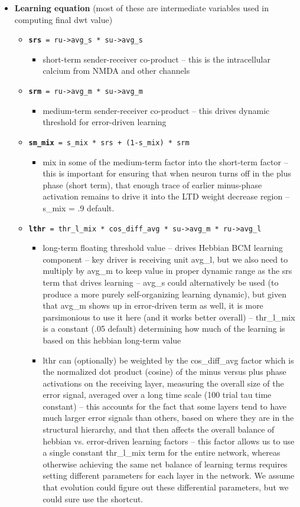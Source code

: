 \begin{itemize}
\item {\bf Learning equation} (most of these are intermediate variables used in computing final dwt value)
  \begin{itemize}
  \item {\tt {\bf srs} = ru->avg\_s * su->avg\_s}
    \begin{itemize}
    \item short-term sender-receiver co-product -- this is the intracellular calcium from NMDA and other channels
    \end{itemize}
  \item {\tt {\bf srm} = ru->avg\_m * su->avg\_m}
    \begin{itemize}
    \item medium-term sender-receiver co-product -- this drives dynamic threshold for error-driven learning
    \end{itemize}
  \item {\tt {\bf sm\_mix} = s\_mix * srs + (1-s\_mix) * srm}
    \begin{itemize}
    \item mix in some of the medium-term factor into the short-term factor -- this is important for ensuring that when neuron turns off in the plus phase (short term), that enough trace of earlier minus-phase activation remains to drive it into the LTD weight decrease region -- s\_mix = .9 default.
    \end{itemize}
  \item {\tt {\bf lthr} = thr\_l\_mix * cos\_diff\_avg * su->avg\_m * ru->avg\_l}
    \begin{itemize}
    \item long-term floating threshold value -- drives Hebbian BCM learning component -- key driver is receiving unit avg\_l, but we also need to multiply by avg\_m to keep value in proper dynamic range as the srs term that drives learning -- avg\_s could alternatively be used (to produce a more purely self-organizing learning dynamic), but given that avg\_m shows up in error-driven term as well, it is more parsimonious to use it here (and it works better overall) -- thr\_l\_mix is a constant (.05 default) determining how much of the learning is based on this hebbian long-term value
    \item lthr can (optionally) be weighted by the cos\_diff\_avg factor which is the normalized dot product (cosine) of the minus versus plus phase activations on the receiving layer, measuring the overall size of the error signal, averaged over a long time scale (100 trial tau time constant) -- this accounts for the fact that some layers tend to have much larger error signals than others, based on where they are in the structural hierarchy, and that then affects the overall balance of hebbian vs. error-driven learning factors -- this factor allows us to use a single constant thr\_l\_mix term for the entire network, whereas otherwise achieving the same net balance of learning terms requires setting different parameters for each layer in the network.  We assume that evolution could figure out these differential parameters, but we could sure use the shortcut.

\end{itemize}
\end{itemize}
\end{itemize}
